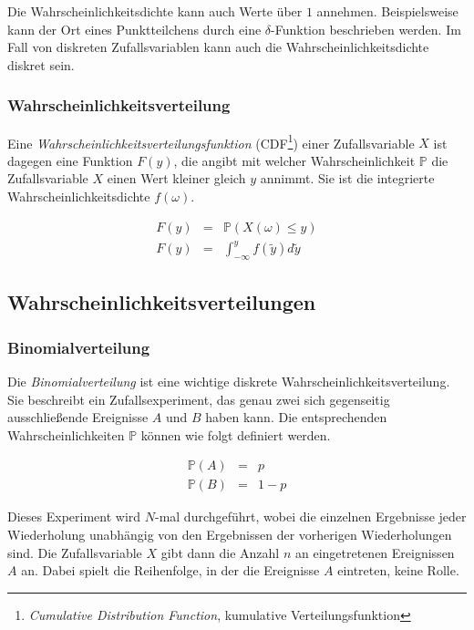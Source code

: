 \documentclass[12pt,a4paper]{scrartcl}
\numberwithin{equation}{section} %
\renewcommand{\[}{} %
\renewcommand{\]}{\noindent} %
\begin{document}
\noindent
Die Wahrscheinlichkeitsdichte kann auch Werte über $1$ annehmen. Beispielsweise kann der Ort eines Punktteilchens durch eine $\delta$-Funktion beschrieben werden. Im Fall von diskreten Zufallsvariablen kann auch die Wahrscheinlichkeitsdichte diskret sein.

\subsubsection{Wahrscheinlichkeitsverteilung}
\label{Wahrscheinlichkeitsverteilung}
Eine \emph{Wahrscheinlichkeitsverteilungsfunktion} (CDF\footnote{\emph{Cumulative Distribution Function}, kumulative Verteilungsfunktion}) einer Zufallsvariable $X$ ist dagegen eine Funktion $F(y)$, die angibt mit welcher Wahrscheinlichkeit $\mathbb P$ die Zufallsvariable $X$ einen Wert kleiner gleich $y$ annimmt. Sie ist die integrierte Wahrscheinlichkeitsdichte $f(\omega)$.

\begin{eqnarray}
	F(y) &=& \mathbb P(X(\omega) \leq y) \\
	F(y) &=& \int_{- \infty}^{y} f(\tilde{y}) d\tilde{y}
\end{eqnarray}

\subsection{Wahrscheinlichkeitsverteilungen}
\label{Wahrscheinlichkeitsverteilungen}

\subsubsection{Binomialverteilung}
\label{Binomialverteilung}
Die \emph{Binomialverteilung} ist eine wichtige diskrete Wahrscheinlichkeitsverteilung. Sie beschreibt ein Zufallsexperiment, das genau zwei sich gegenseitig ausschließende Ereignisse $A$ und $B$ haben kann. Die entsprechenden Wahrscheinlichkeiten $\mathbb P$ können wie folgt definiert werden.

\begin{eqnarray}
	\mathbb P(A) &=& p \\
	\mathbb P(B) &=& 1 - p
\end{eqnarray}

\noindent
Dieses Experiment wird $N$-mal durchgeführt, wobei die einzelnen Ergebnisse jeder Wiederholung unabhängig von den Ergebnissen der vorherigen Wiederholungen sind. Die Zufallsvariable $X$ gibt dann die Anzahl $n$ an eingetretenen Ereignissen $A$ an. Dabei spielt die Reihenfolge, in der die Ereignisse $A$ eintreten, keine Rolle.
\end{document}
